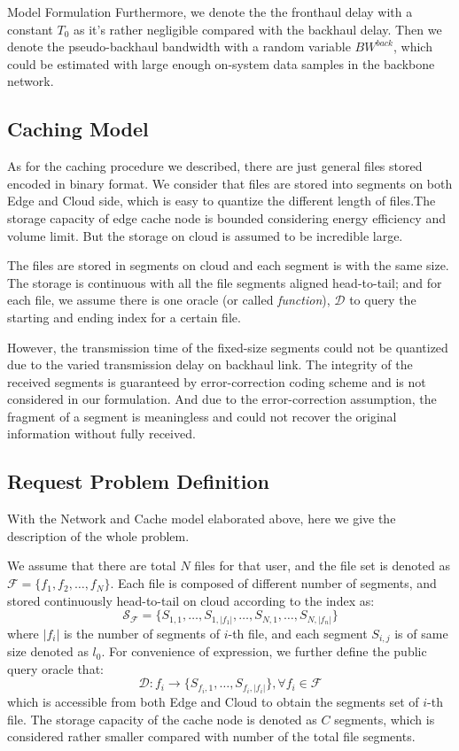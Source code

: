 \documentclass{article}
\begin{document}
\begin{section}{Model Formulation}
    Furthermore, we denote the the fronthaul delay with a constant $T_0$ as it's rather negligible compared with the backhaul delay. Then we denote the pseudo-backhaul bandwidth with a random variable $BW^{back}$, which could be estimated with large enough on-system data samples in the backbone network.
    
    \subsection{Caching Model}
    As for the caching procedure we described, there are just general files stored encoded in binary format. We consider that files are stored into segments on both Edge and Cloud side, which is easy to quantize the different length of files.The storage capacity of edge cache node is bounded considering energy efficiency and volume limit. But the storage on cloud is assumed to be incredible large.
    
    The files are stored in segments on cloud and each segment is with the same size. The storage is continuous with all the file segments aligned head-to-tail; and for each file, we assume there is one oracle (or called \textit{function}), $\mathcal{D}$ to query the starting and ending index for a certain file.

    However, the transmission time of the fixed-size segments could not be quantized due to the varied transmission delay on backhaul link. The integrity of the received segments is guaranteed by error-correction coding scheme and is not considered in our formulation. And due to the error-correction assumption, the fragment of a segment is meaningless and could not recover the original information without fully received.

    \subsection{Request Problem Definition}
    With the Network and Cache model elaborated above, here we give the description of the whole problem.

    We assume that there are total $N$ files for that user, and the file set is denoted as $\mathcal{F} = \{f_1, f_2, \dots, f_N\}$. Each file is composed of different number of segments, and stored continuously head-to-tail on cloud according to the index as:
    $$
    \mathcal{S_F} = \{S_{1,1}, \dots, S_{1,|f_1|}, \dots, S_{N,1}, \dots, S_{N,|f_n|}\}
    $$
    where $|f_i|$ is the number of segments of $i$-th file, and each segment $S_{i,j}$ is of same size denoted as $l_0$. For convenience of expression, we further define the public query oracle that:
    $$
    \mathcal{D}:f_i \to \{S_{f_i,1}, \dots, S_{f_i,|f_i|}\}, \forall f_i \in \mathcal{F}
    $$
    which is accessible from both Edge and Cloud to obtain the segments set of $i$-th file. The storage capacity of the cache node is denoted as $C$ segments, which is considered rather smaller compared with number of the total file segments.


\end{section}
\end{document}

